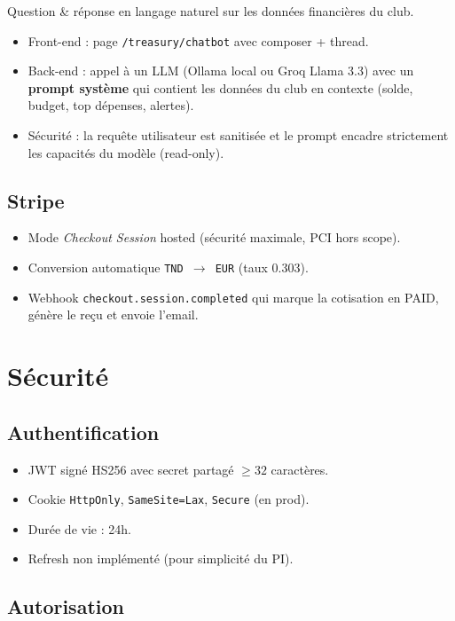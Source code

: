 \documentclass[11pt,a4paper]{report}
\begin{document}
Question \& réponse en langage naturel sur les données financières du club.
\begin{itemize}
  \item Front-end : page \texttt{/treasury/chatbot} avec composer + thread.
  \item Back-end : appel à un LLM (Ollama local ou Groq Llama 3.3) avec un
        \textbf{prompt système} qui contient les données du club en contexte
        (solde, budget, top dépenses, alertes).
  \item Sécurité : la requête utilisateur est sanitisée et le prompt encadre
        strictement les capacités du modèle (read-only).
\end{itemize}

\section{Stripe}

\begin{itemize}
  \item Mode \textit{Checkout Session} hosted (sécurité maximale, PCI hors
        scope).
  \item Conversion automatique \texttt{TND \(\rightarrow\) EUR} (taux 0.303).
  \item Webhook \texttt{checkout.session.completed} qui marque la cotisation
        en PAID, génère le reçu et envoie l'email.
\end{itemize}


\chapter{Sécurité}

\section{Authentification}
\begin{itemize}
  \item JWT signé HS256 avec secret partagé \(\geq 32\) caractères.
  \item Cookie \texttt{HttpOnly}, \texttt{SameSite=Lax}, \texttt{Secure} (en prod).
  \item Durée de vie : 24h.
  \item Refresh non implémenté (pour simplicité du PI).
\end{itemize}

\section{Autorisation}
\end{document}
